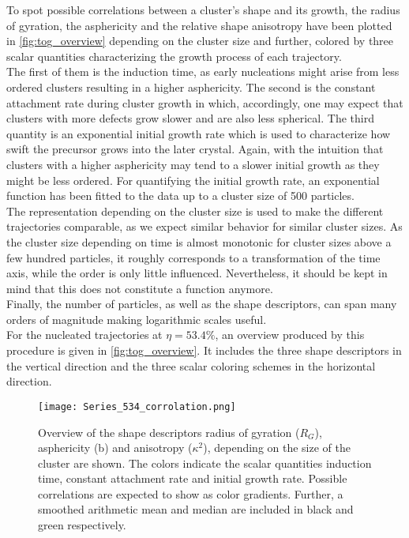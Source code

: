 To spot possible correlations between a cluster's shape and its growth, the radius of gyration, the asphericity and the relative shape anisotropy have been plotted in \autoref{fig:tog_overview} depending on the cluster size and further, colored by three scalar quantities characterizing the growth process of each trajectory.\\ 
The first of them is the induction time, as early nucleations might arise from less ordered clusters resulting in a higher asphericity. The second is the constant attachment rate during cluster growth in which, accordingly, one may expect that clusters with more defects grow slower and are also less spherical. The third quantity is an exponential initial growth rate which is used to characterize how swift the precursor grows into the later crystal. Again, with the intuition that clusters with a higher asphericity may tend to a slower initial growth as they might be less ordered. For quantifying the initial growth rate, an exponential function has been fitted to the data up to a cluster size of 500 particles.\\
The representation depending on the cluster size is used to make the different trajectories comparable, as we expect similar behavior for similar cluster sizes. As the cluster size depending on time is almost monotonic for cluster sizes above a few hundred particles, it roughly corresponds to a transformation of the time axis, while the order is only little influenced. Nevertheless, it should be kept in mind that this does not constitute a function anymore.\\
Finally, the number of particles, as well as the shape descriptors, can span many orders of magnitude making logarithmic scales useful.\\

For the nucleated trajectories at $\eta=53.4\%$, an overview produced by this procedure is given in \autoref{fig:tog_overview}. It includes the three shape descriptors in the vertical direction and the three scalar coloring schemes in the horizontal direction.\\

\begin{figure}[!h]
\centering
\texttt{[image: Series\_534\_corrolation.png]}
\caption[Tensor of gyration measurements from production data]{Overview of the shape descriptors radius of gyration ($R_G$), asphericity (b) and anisotropy ($\kappa^2$), depending on the size of the cluster are shown. The colors indicate the scalar quantities induction time, constant attachment rate and initial growth rate. Possible correlations are expected to show as color gradients. Further, a smoothed arithmetic mean and median are included in black and green respectively.}
\label{fig:tog_overview}
\end{figure}

